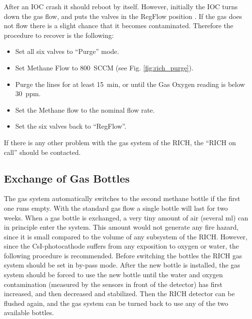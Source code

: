{After an IOC crash it should reboot by itself.
However, initially the IOC turns down the gas flow, and puts
the valves in the RegFlow position . 
If the gas does not flow
there is a slight chance that it becomes contaminated. 
Therefore the procedure to recover is the following:
\begin{itemize}
\item Set all six valves to ``Purge'' mode.
\item Set Methane Flow to 800~SCCM (see Fig. \ref{fig:rich_purge}).
\item Purge the lines for at least 15~min, or until the Gas Oxygen 
reading is below 30~ppm.
\item Set the Methane flow to the nominal flow rate.
\item Set the six valves back to ``RegFlow''.
\end{itemize}


If there is any other problem with the gas system of the RICH,
the ``RICH on call'' should be contacted.




\subsection{Exchange of Gas Bottles}

The gas system automatically switches to the second methane bottle if the first one 
runs empty. With the standard gas flow a single bottle will last for two weeks.
When a gas bottle is exchanged, a very tiny amount of air (several ml) can in principle 
enter the system. This amount would not generate any fire hazard, since it is small
compared to the volume of any subsystem of the RICH. However, since the CsI-photocathode
suffers from any exposition to oxygen or water, the following procedure is recommended.
Before switching the bottles the RICH gas system should be set in by-pass mode.
After the new bottle is installed, the gas system should be forced to use the new bottle
until the water and oxygen contamination (measured by the sensors in front of the detector)
has first increased, and then decreased and stabilized. Then the RICH detector can be flushed
again, and the gas system can be turned back to use any of the two available bottles.
}
 
